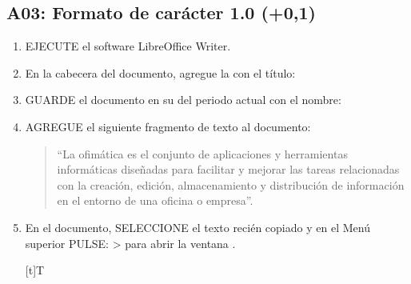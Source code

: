 \documentclass[letterpaper,10pt,spanish]{sphinxmanual}
\let\sphinxpxdimen\pdfpxdimen\else\newdimen\sphinxpxdimen
\begin{document}
\subsection{A03: Formato de carácter 1.0  (+0,1)}
\label{\detokenize{1_guias/10ofimatica/G1014:a03-formato-de-caracter-1-0-101-0-1}}
\sphinxAtStartPar
{}
\begin{enumerate}
%
\item {} 
\sphinxAtStartPar
EJECUTE el software LibreOffice Writer.

\item {} 
\sphinxAtStartPar
En la cabecera del documento, agregue la  con el título: 

\item {} 
\sphinxAtStartPar
GUARDE el documento en su  del periodo actual con el nombre: 

\item {} 
\sphinxAtStartPar
AGREGUE el siguiente fragmento de texto al documento:
\begin{quote}

\sphinxAtStartPar
“La ofimática es el conjunto de aplicaciones y herramientas informáticas diseñadas para facilitar y mejorar las tareas relacionadas con la creación, edición, almacenamiento y distribución de información en el entorno de una oficina o empresa”.
\end{quote}

\item {} 
\sphinxAtStartPar
En el documento, SELECCIONE el texto recién copiado y en el Menú superior PULSE:  >  para abrir la ventana .


\begin{savenotes}\sphinxattablestart
\sphinxthistablewithglobalstyle
\centering
\begin{tabulary}{\linewidth}[t]{T}
\sphinxtoprule
\sphinxtableatstartofbodyhook

\begin{sphinxfigure-in-table}
\centering
\capstart
\noindent\sphinxincludegraphics[width=260\sphinxpxdimen]{{image035}.png}
\label{\detokenize{1_guias/10ofimatica/G1014:id3}}\end{sphinxfigure-in-table}\relax
\\
\sphinxbottomrule
\end{tabulary}
\sphinxtableafterendhook\par
\sphinxattableend\end{savenotes}


\end{enumerate}
\end{document}
